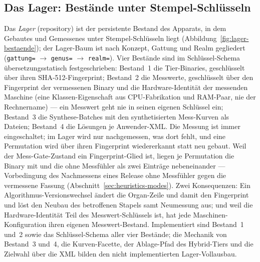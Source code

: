 \begin{nurkurz}
\subsection{Das Lager: Bestände unter Stempel-Schlüsseln}\label{sec:lager}
Das \emph{Lager} (repository) ist der persistente Bestand des Apparats, in dem Gebautes und Gemessenes unter
Stempel-Schlüsseln liegt (Abbildung~\ref{fig:lager-bestaende}); der Lager-Baum ist nach Konzept, Gattung und Realm
gegliedert (\texttt{gattung=} $\to$ \texttt{genus=} $\to$ \texttt{realm=}). Vier Bestände sind im
Schlüssel-Schema übersetzungsstatisch festgeschrieben: Bestand~1 die Tier-Binaries, geschlüsselt über ihren
SHA-512-Fingerprint; Bestand~2 die Messwerte, geschlüsselt über den Fingerprint der vermessenen Binary und die
Hardware-Identität der messenden Maschine (eine Klassen-Eigenschaft aus CPU-Fabrikation und RAM-Paar, nie der
Rechnername) --- ein Messwert geht nie in seinen eigenen Schlüssel ein; Bestand~3 die Synthese-Batches mit den
synthetisierten Mess-Kurven als Dateien; Bestand~4 die Lösungen je Anwender-XML\@. Die Messung ist immer
eingeschaltet; im Lager wird nur nachgemessen, was dort fehlt, und eine Permutation wird über ihren Fingerprint
wiedererkannt statt neu gebaut. Weil der Mess-Gate-Zustand ein Fingerprint-Glied ist, liegen je Permutation die
Binary mit und die ohne Messfühler als zwei Einträge nebeneinander --- Vorbedingung des Nachmessens eines
Release ohne Messfühler gegen die vermessene Fassung (Abschnitt~\ref{sec:heuristics-modes}). Zwei Konsequenzen:
Ein Algorithmus-Versionswechsel ändert die Organ-Zeile und damit den Fingerprint und löst den Neubau des
betroffenen Stapels samt Neumessung aus; und weil die Hardware-Identität Teil des Messwert-Schlüssels ist, hat
jede Maschinen-Konfiguration ihren eigenen Messwert-Bestand. Implementiert sind Bestand~1 und~2 sowie das
Schlüssel-Schema aller vier Bestände; die Mechanik von Bestand~3 und~4, die Kurven-Facette, der Ablage-Pfad des
Hybrid-Tiers und die Zielwahl über die XML bilden den nicht implementierten Lager-Vollausbau.
\begin{figure}[htbp]\centering
{}
\end{figure}
\end{nurkurz}
